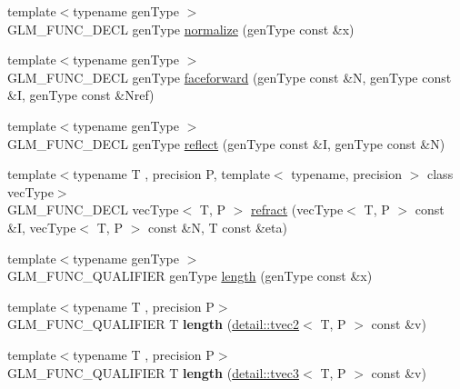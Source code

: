 \begin{DoxyCompactItemize}
\item 
{\footnotesize template$<$typename gen\+Type $>$ }\\G\+L\+M\+\_\+\+F\+U\+N\+C\+\_\+\+D\+E\+CL gen\+Type \hyperlink{group__core__func__geometric_ga15aa87101457e41663b08a8dcc3357f8}{normalize} (gen\+Type const \&x)
\item 
{\footnotesize template$<$typename gen\+Type $>$ }\\G\+L\+M\+\_\+\+F\+U\+N\+C\+\_\+\+D\+E\+CL gen\+Type \hyperlink{group__core__func__geometric_ga4bbb036ef9527ee9f67384233029ed9b}{faceforward} (gen\+Type const \&N, gen\+Type const \&I, gen\+Type const \&Nref)
\item 
{\footnotesize template$<$typename gen\+Type $>$ }\\G\+L\+M\+\_\+\+F\+U\+N\+C\+\_\+\+D\+E\+CL gen\+Type \hyperlink{group__core__func__geometric_gab63646fc36b81cf69d3ce123a72f76f2}{reflect} (gen\+Type const \&I, gen\+Type const \&N)
\item 
{\footnotesize template$<$typename T , precision P, template$<$ typename, precision $>$ class vec\+Type$>$ }\\G\+L\+M\+\_\+\+F\+U\+N\+C\+\_\+\+D\+E\+CL vec\+Type$<$ T, P $>$ \hyperlink{group__core__func__geometric_ga99d8ddb244b129892babaca9778206d0}{refract} (vec\+Type$<$ T, P $>$ const \&I, vec\+Type$<$ T, P $>$ const \&N, T const \&eta)
\item 
{\footnotesize template$<$typename gen\+Type $>$ }\\G\+L\+M\+\_\+\+F\+U\+N\+C\+\_\+\+Q\+U\+A\+L\+I\+F\+I\+ER gen\+Type \hyperlink{group__core__func__geometric_ga03b2831439defb8922832b540b91b8a7}{length} (gen\+Type const \&x)
\item 
{\footnotesize template$<$typename T , precision P$>$ }\\G\+L\+M\+\_\+\+F\+U\+N\+C\+\_\+\+Q\+U\+A\+L\+I\+F\+I\+ER T {\bfseries length} (\hyperlink{structglm_1_1detail_1_1tvec2}{detail\+::tvec2}$<$ T, P $>$ const \&v)\hypertarget{namespaceglm_a2b1957c9c773e5f63c0e843c732000a3}{}\label{namespaceglm_a2b1957c9c773e5f63c0e843c732000a3}

\item 
{\footnotesize template$<$typename T , precision P$>$ }\\G\+L\+M\+\_\+\+F\+U\+N\+C\+\_\+\+Q\+U\+A\+L\+I\+F\+I\+ER T {\bfseries length} (\hyperlink{structglm_1_1detail_1_1tvec3}{detail\+::tvec3}$<$ T, P $>$ const \&v)\hypertarget{namespaceglm_a9b77c44ed4ba8ed4842e50ae90676aa8}{}\label{namespaceglm_a9b77c44ed4ba8ed4842e50ae90676aa8}


\end{DoxyCompactItemize}
